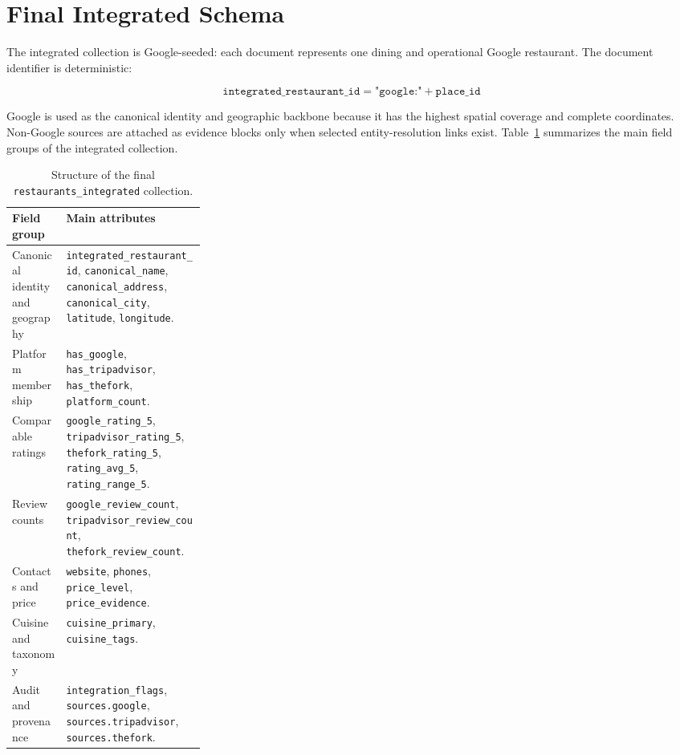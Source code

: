 \section{Final Integrated Schema}

The integrated collection is Google-seeded: each document represents one dining
and operational Google restaurant. The document identifier is deterministic:

\[
\texttt{integrated\_restaurant\_id} = \texttt{"google:"} + \texttt{place\_id}
\]

Google is used as the canonical identity and geographic backbone because it has
the highest spatial coverage and complete coordinates. Non-Google sources are
attached as evidence blocks only when selected entity-resolution links exist.
Table~\ref{tab:integrated-schema-overview} summarizes the main field groups of
the integrated collection.

\begin{table}[t]
\centering
\footnotesize
\begin{tabularx}{\linewidth}{p{0.28\linewidth}X}
\toprule
\textbf{Field group} & \textbf{Main attributes} \\
\midrule
Canonical identity and geography &
\texttt{integrated\_restaurant\_id}, \texttt{canonical\_name},
\texttt{canonical\_address}, \texttt{canonical\_city},
\texttt{latitude}, \texttt{longitude}. \\
Platform membership &
\texttt{has\_google}, \texttt{has\_tripadvisor}, \texttt{has\_thefork},
\texttt{platform\_count}. \\
Comparable ratings &
\texttt{google\_rating\_5}, \texttt{tripadvisor\_rating\_5},
\texttt{thefork\_rating\_5}, \texttt{rating\_avg\_5},
\texttt{rating\_range\_5}. \\
Review counts &
\texttt{google\_review\_count}, \texttt{tripadvisor\_review\_count}, \texttt{thefork\_review\_count}. \\
Contacts and price &
\texttt{website}, \texttt{phones}, \texttt{price\_level},
\texttt{price\_evidence}. \\
Cuisine and taxonomy &
\texttt{cuisine\_primary}, \texttt{cuisine\_tags}. \\
Audit and provenance &
\texttt{integration\_flags}, \texttt{sources.google},
\texttt{sources.tripadvisor}, \texttt{sources.thefork}. \\
\bottomrule
\end{tabularx}
\caption{Structure of the final \texttt{restaurants\_integrated} collection.}
\label{tab:integrated-schema-overview}
\end{table}

